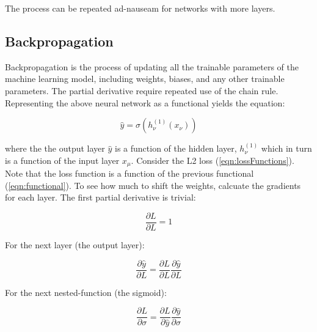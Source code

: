 \noindent The process can be repeated ad-nauseam for networks with more layers.

\subsection{Backpropagation}
Backpropagation is the process of updating all the trainable parameters of the machine learning model, including weights, biases, and any other trainable parameters. The partial derivative require repeated use of the chain rule. Representing the above neural network as a functional yields the equation:


\begin{equation}
    \label{eqn:functional}
    \hat{y} = \sigma \left( h_\nu ^{(1)} \left( x_\nu \right) \right)
\end{equation}

\noindent where the the output layer $ \hat{y} $ is a function of the hidden layer, $ h_\nu ^{(1)} $ which in turn is a function of the input layer $ x_\mu $. Consider the L2 loss (\ref{eqn:lossFunctions}). Note that the loss function is a function of the previous functional (\ref{eqn:functional}). To see how much to shift the weights, calcuate the gradients for each layer. The first partial derivative is trivial:

\begin{equation}
    \frac{\partial L}{\partial L} = 1
\end{equation}

\noindent For the next layer (the output layer):

\begin{equation}
\frac{\partial \hat{y}}{\partial L} = \frac{\partial L}{\partial L}\frac{\partial \hat{y}}{\partial L}
\end{equation}


\noindent For the next nested-function (the sigmoid):

\begin{equation}
\frac{\partial L}{\partial \sigma} = \frac{\partial L}{\partial \hat{y}} \frac{\partial \hat{y}}{\partial \sigma}
\end{equation}


